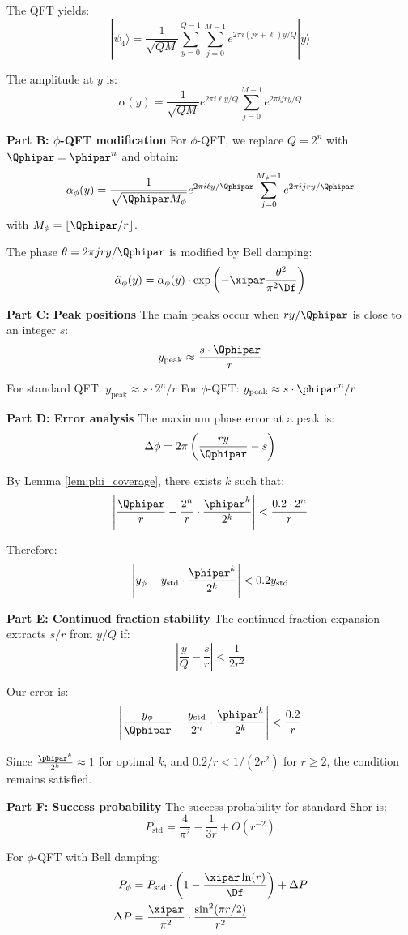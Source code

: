 The QFT yields:
\[
|\psi_4\rangle = \frac{1}{\sqrt{QM}} \sum_{y=0}^{Q-1} \sum_{j=0}^{M-1} e^{2\pi i (jr + \ell)y/Q} |y\rangle
\]

The amplitude at $y$ is:
\[
\alpha(y) = \frac{1}{\sqrt{QM}} e^{2\pi i \ell y/Q} \sum_{j=0}^{M-1} e^{2\pi i j r y/Q}
\]

\textbf{Part B: $\phi$-QFT modification}
For $\phi$-QFT, we replace $Q = 2^n$ with $\Qphipar = \phipar^n$ and obtain:
\[
\alpha_{\phi}(y) = \frac{1}{\sqrt{\Qphipar M_{\phi}}} e^{2\pi i \ell y/\Qphipar} \sum_{j=0}^{M_{\phi}-1} e^{2\pi i j r y/\Qphipar}
\]
with $M_{\phi} = \lfloor \Qphipar/r \rfloor$.

The phase $\theta = 2\pi j r y/\Qphipar$ is modified by Bell damping:
\[
\tilde{\alpha}_{\phi}(y) = \alpha_{\phi}(y) \cdot \exp\left(-\xipar \frac{\theta^2}{\pi^2 \Df}\right)
\]

\textbf{Part C: Peak positions}
The main peaks occur when $ry/\Qphipar$ is close to an integer $s$:
\[
y_{\text{peak}} \approx \frac{s \cdot \Qphipar}{r}
\]

For standard QFT: $y_{\text{peak}} \approx s \cdot 2^n / r$
For $\phi$-QFT: $y_{\text{peak}} \approx s \cdot \phipar^n / r$

\textbf{Part D: Error analysis}
The maximum phase error at a peak is:
\[
\Delta\phi = 2\pi \left( \frac{ry}{\Qphipar} - s \right)
\]

By Lemma \ref{lem:phi_coverage}, there exists $k$ such that:
\[
\left| \frac{\Qphipar}{r} - \frac{2^n}{r} \cdot \frac{\phipar^k}{2^k} \right| < \frac{0.2 \cdot 2^n}{r}
\]

Therefore:
\[
\left| y_{\phi} - y_{\text{std}} \cdot \frac{\phipar^k}{2^k} \right| < 0.2 y_{\text{std}}
\]

\textbf{Part E: Continued fraction stability}
The continued fraction expansion extracts $s/r$ from $y/Q$ if:
\[
\left| \frac{y}{Q} - \frac{s}{r} \right| < \frac{1}{2r^2}
\]

Our error is:
\[
\left| \frac{y_{\phi}}{\Qphipar} - \frac{y_{\text{std}}}{2^n} \cdot \frac{\phipar^k}{2^k} \right| < \frac{0.2}{r}
\]

Since $\frac{\phipar^k}{2^k} \approx 1$ for optimal $k$, and $0.2/r < 1/(2r^2)$ for $r \geq 2$, the condition remains satisfied.

\textbf{Part F: Success probability}
The success probability for standard Shor is:
\[
P_{\text{std}} = \frac{4}{\pi^2} - \frac{1}{3r} + O(r^{-2})
\]

For $\phi$-QFT with Bell damping:
\begin{align*}
	P_{\phi} &= P_{\text{std}} \cdot \left(1 - \frac{\xipar \ln(r)}{\Df}\right) + \Delta P \\
	\Delta P &= \frac{\xipar}{\pi^2} \cdot \frac{\sin^2(\pi r/2)}{r^2}
\end{align*}

